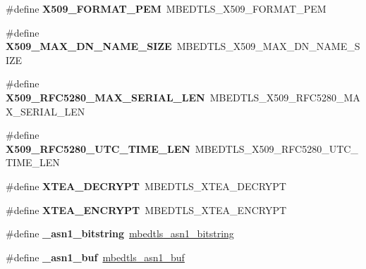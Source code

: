 \begin{DoxyCompactItemize}
\item 
\mbox{\label{compat-1_83_8h_ae61b2a208043d2d1cfdfea019a15c59b}} 
\#define {\bfseries X509\+\_\+\+F\+O\+R\+M\+A\+T\+\_\+\+P\+EM}~M\+B\+E\+D\+T\+L\+S\+\_\+\+X509\+\_\+\+F\+O\+R\+M\+A\+T\+\_\+\+P\+EM
\item 
\mbox{\label{compat-1_83_8h_a3c586080deeac54ce8159bd24fdb64cc}} 
\#define {\bfseries X509\+\_\+\+M\+A\+X\+\_\+\+D\+N\+\_\+\+N\+A\+M\+E\+\_\+\+S\+I\+ZE}~M\+B\+E\+D\+T\+L\+S\+\_\+\+X509\+\_\+\+M\+A\+X\+\_\+\+D\+N\+\_\+\+N\+A\+M\+E\+\_\+\+S\+I\+ZE
\item 
\mbox{\label{compat-1_83_8h_a8099883128d3a26dc00e33814def210b}} 
\#define {\bfseries X509\+\_\+\+R\+F\+C5280\+\_\+\+M\+A\+X\+\_\+\+S\+E\+R\+I\+A\+L\+\_\+\+L\+EN}~M\+B\+E\+D\+T\+L\+S\+\_\+\+X509\+\_\+\+R\+F\+C5280\+\_\+\+M\+A\+X\+\_\+\+S\+E\+R\+I\+A\+L\+\_\+\+L\+EN
\item 
\mbox{\label{compat-1_83_8h_abc0cae2aafa220212a00ae64dffa49b4}} 
\#define {\bfseries X509\+\_\+\+R\+F\+C5280\+\_\+\+U\+T\+C\+\_\+\+T\+I\+M\+E\+\_\+\+L\+EN}~M\+B\+E\+D\+T\+L\+S\+\_\+\+X509\+\_\+\+R\+F\+C5280\+\_\+\+U\+T\+C\+\_\+\+T\+I\+M\+E\+\_\+\+L\+EN
\item 
\mbox{\label{compat-1_83_8h_a12112dc96c2e7b6f1b6a5b38a9471c01}} 
\#define {\bfseries X\+T\+E\+A\+\_\+\+D\+E\+C\+R\+Y\+PT}~M\+B\+E\+D\+T\+L\+S\+\_\+\+X\+T\+E\+A\+\_\+\+D\+E\+C\+R\+Y\+PT
\item 
\mbox{\label{compat-1_83_8h_aa75a338c8b1485f3dcd52ff788312136}} 
\#define {\bfseries X\+T\+E\+A\+\_\+\+E\+N\+C\+R\+Y\+PT}~M\+B\+E\+D\+T\+L\+S\+\_\+\+X\+T\+E\+A\+\_\+\+E\+N\+C\+R\+Y\+PT
\item 
\mbox{\label{compat-1_83_8h_a06479d978058f067720ac3a344e8c2d4}} 
\#define {\bfseries \+\_\+asn1\+\_\+bitstring}~\mbox{\hyperlink{structmbedtls__asn1__bitstring}{mbedtls\+\_\+asn1\+\_\+bitstring}}
\item 
\mbox{\label{compat-1_83_8h_ac3ab200680c4d12e0d72d99d4f813df4}} 
\#define {\bfseries \+\_\+asn1\+\_\+buf}~\mbox{\hyperlink{structmbedtls__asn1__buf}{mbedtls\+\_\+asn1\+\_\+buf}}
\item 

\end{DoxyCompactItemize}
